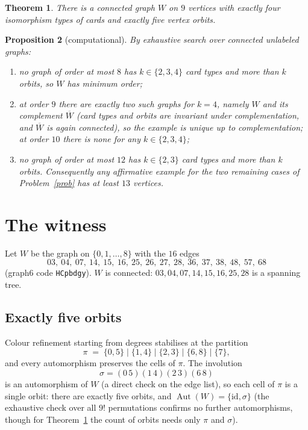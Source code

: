 \documentclass[11pt]{article}
\newtheorem{theorem}{Theorem}
\newtheorem{proposition}[theorem]{Proposition}
\theoremstyle{remark}
\begin{document}
\begin{theorem}\label{thm:main}
There is a connected graph $W$ on $9$ vertices with exactly four
isomorphism types of cards and exactly five vertex orbits.
\end{theorem}

\begin{proposition}[computational]\label{prop:census}
By exhaustive search over connected unlabeled graphs:
\begin{enumerate}
\item no graph of order at most $8$ has $k \in \{2,3,4\}$ card types and
more than $k$ orbits, so $W$ has minimum order;
\item at order $9$ there are exactly two such graphs for $k = 4$, namely
$W$ and its complement $\overline{W}$ (card types and orbits are invariant
under complementation, and $\overline{W}$ is again connected), so the
example is unique up to complementation; at order $10$ there is none for
any $k \in \{2,3,4\}$;
\item no graph of order at most $12$ has $k \in \{2,3\}$ card types and
more than $k$ orbits. Consequently any affirmative example for the two
remaining cases of Problem~\ref{prob} has at least $13$ vertices.
\end{enumerate}
\end{proposition}

\section{The witness}

Let $W$ be the graph on $\{0, 1, \dots, 8\}$ with the $16$ edges
\[
03,\ 04,\ 07,\ 14,\ 15,\ 16,\ 25,\ 26,\ 27,\ 28,\ 36,\ 37,\ 38,\ 48,\ 57,\ 68
\]
(graph6 code \verb|HCpbdgy|). $W$ is connected: $03, 04, 07, 14, 15, 16,
25, 28$ is a spanning tree.

\subsection{Exactly five orbits}

Colour refinement starting from degrees stabilises at the partition
\[
\pi \;=\; \{0,5\} \mid \{1,4\} \mid \{2,3\} \mid \{6,8\} \mid \{7\},
\]
and every automorphism preserves the cells of $\pi$. The involution
\[
\sigma = (0\,5)(1\,4)(2\,3)(6\,8)
\]
is an automorphism of $W$ (a direct check on the edge list), so each cell
of $\pi$ is a single orbit: there are exactly five orbits, and
$\operatorname{Aut}(W) = \{\mathrm{id}, \sigma\}$ (the exhaustive check
over all $9!$ permutations confirms no further automorphisms, though for
Theorem~\ref{thm:main} the count of orbits needs only $\pi$ and $\sigma$).
\end{document}
